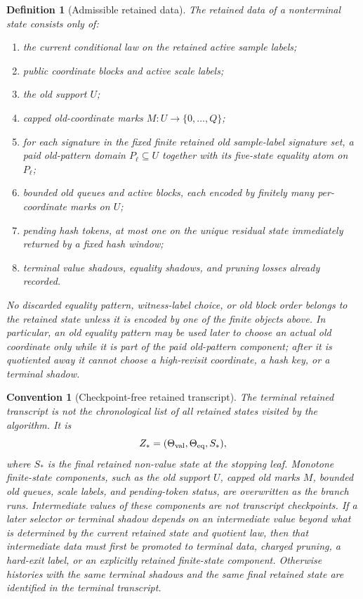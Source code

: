 \documentclass[11pt]{article}
\newtheorem{definition}[theorem]{Definition}
\newtheorem{convention}[theorem]{Convention}
\theoremstyle{remark}
\begin{document}
\begin{definition}[Admissible retained data]
The retained data of a nonterminal state consists only of:
\begin{enumerate}[label=\textup{(\roman*)}]
\item the current conditional law on the retained active sample labels;
\item public coordinate blocks and active scale labels;
\item the old support $U$;
\item capped old-coordinate marks $M:U\to\{0,\ldots,Q\}$;
\item for each signature in the fixed finite retained old sample-label signature set, a paid old-pattern domain $P_\ell\subseteq U$ together with its five-state equality atom on $P_\ell$;
\item bounded old queues and active blocks, each encoded by finitely many per-coordinate marks on $U$;
\item pending hash tokens, at most one on the unique residual state immediately returned by a fixed hash window;
\item terminal value shadows, equality shadows, and pruning losses already recorded.
\end{enumerate}
No discarded equality pattern, witness-label choice, or old block order belongs to the retained state unless it is encoded by one of the finite objects above.  In particular, an old equality pattern may be used later to choose an actual old coordinate only while it is part of the paid old-pattern component; after it is quotiented away it cannot choose a high-revisit coordinate, a hash key, or a terminal shadow.
\end{definition}

\begin{convention}[Checkpoint-free retained transcript]\label{conv:checkpoint-free}
The terminal retained transcript is not the chronological list of all retained states visited by the algorithm.  It is
\[
        Z_*=(\Theta_{\rm val},\Theta_{\rm eq},S_*),
\]
where $S_*$ is the final retained non-value state at the stopping leaf.  Monotone finite-state components, such as the old support $U$, capped old marks $M$, bounded old queues, scale labels, and pending-token status, are overwritten as the branch runs.  Intermediate values of these components are not transcript checkpoints.  If a later selector or terminal shadow depends on an intermediate value beyond what is determined by the current retained state and quotient law, then that intermediate data must first be promoted to terminal data, charged pruning, a hard-exit label, or an explicitly retained finite-state component.  Otherwise histories with the same terminal shadows and the same final retained state are identified in the terminal transcript.
\end{convention}
\end{document}

